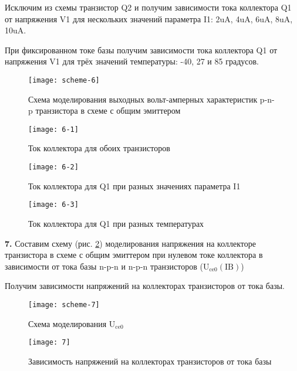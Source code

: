 \documentclass{semi}
\begin{document}
Исключим из схемы транзистор Q2 и получим зависимости тока коллектора Q1 от напряжения V1 для нескольких значений параметра I1: 2uA, 4uA, 6uA, 8uA, 10uA.

При фиксированном токе базы получим зависимости тока коллектора Q1 от напряжения V1 для трёх значений температуры: -40, 27 и 85 градусов.

\begin{figure}[H]
	\centering
	\texttt{[image: scheme-6]}
	\caption{Схема моделирования выходных вольт-амперных характеристик p-n-p транзистора в схеме с общим эмиттером}
	\label{scheme-6}
\end{figure}

\begin{figure}[H]
	\centering
	\texttt{[image: 6-1]}
	\caption{Ток коллектора для обоих транзисторов}
\end{figure}

\begin{figure}[H]
	\centering
	\texttt{[image: 6-2]}
	\caption{Ток коллектора для Q1 при разных значениях параметра I1}
\end{figure}

\begin{figure}[H]
	\centering
	\texttt{[image: 6-3]}
	\caption{Ток коллектора для Q1 при разных температурах}
\end{figure}

\textbf{{\normalsize 7.}}
Составим схему (рис. \ref{scheme-7}) моделирования напряжения на коллекторе транзистора в схеме с общим эмиттером при нулевом токе коллектора в зависимости от тока базы n-p-n и n-p-n транзисторов ($ \text{U}_{\text{ce}0} (\text{IB}) $)

Получим зависимости напряжений на коллекторах транзисторов от тока базы.

\begin{figure}[H]
	\centering
	\texttt{[image: scheme-7]}
	\caption{Схема моделирования $ \text{U}_{\text{ce}0} $}
	\label{scheme-7}
\end{figure}

\begin{figure}[H]
	\centering
	\texttt{[image: 7]}
	\caption{Зависимость напряжений на коллекторах транзисторов от тока базы}
\end{figure}
\end{document}
